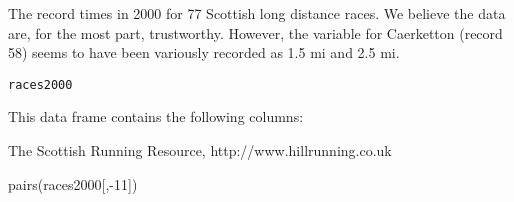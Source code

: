 \begin{Description}\relax
The record times in 2000 for 77 Scottish long distance
races.  We
believe the data are, for the most part, trustworthy.  However,
the  variable for Caerketton (record 58) seems
to have been variously recorded as 1.5 mi and 2.5 mi.
\end{Description}
\begin{Usage}
\begin{verbatim}races2000\end{verbatim}
\end{Usage}
\begin{Format}\relax
This data frame contains the following columns:
\end{Format}
\begin{Source}\relax
The Scottish Running Resource, http://www.hillrunning.co.uk
\end{Source}
\begin{Examples}
\begin{ExampleCode}
    pairs(races2000[,-11])
\end{ExampleCode}
\end{Examples}

